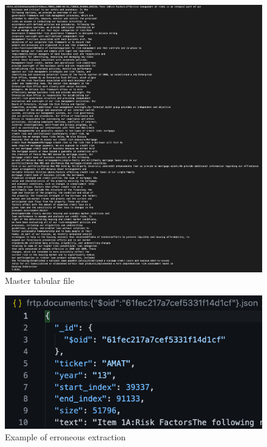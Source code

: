 \documentclass[12pt,MSc,a4paper,oneside]{muthesis}
\begin{document}
    \label{appendix:3}
    \begin{figure}[h]
      \centering
      \includegraphics[scale=0.25]{images/master_tabular_file.png}
      \caption{Master tabular file}
    \end{figure}

    \label{appendix:4}
    \begin{figure}[h]
      \centering
      \includegraphics[scale=0.7]{images/erroneous_token.png}
      \caption{Example of erroneous extraction}
    \end{figure}
\end{document}
